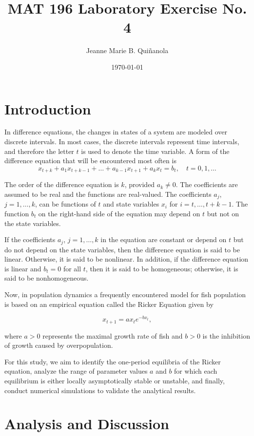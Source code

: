 \documentclass [a4paper]{article}
\title{MAT 196 Laboratory Exercise No. 4}
\author{Jeanne Marie B. Quiñanola}
\date{\today}
\begin{document}
\maketitle

\section{Introduction}
In difference equations, the changes in states of a system are modeled over discrete intervals. In most cases, the discrete intervals represent time intervals, and therefore the letter \(t\) is used to denote the time variable.
A form of the difference equation that will be encountered most often is 
\[
x_{t + k} + a_1 x_{t+k-1} + \ldots + a_{k-1} x_{t+1} + a_k x_t = b_t, \quad t = 0, 1,\ldots\]

The order of the difference equation is \(k\), provided \(a_k \neq 0\). The coefficients are assumed to be real and the functions are real-valued. The coefficients \(a_j\), \(j = 1, \ldots, k\), can be functions of \(t\) and state variables \(x_i\) for \(i = t, \ldots, t + k - 1\). The function \(b_t\) on the right-hand side of the equation may depend on \(t\) but not on the state variables.

If the coefficients \(a_j\), \(j = 1, \ldots, k\) in the equation are constant or depend on \(t\) but do not depend on the state variables, then the difference equation is said to be linear. Otherwise, it is said to be nonlinear. In addition, if the difference equation is linear and \(b_t = 0\) for all \(t\), then it is said to be homogeneous; otherwise, it is said to be nonhomogeneous.\cite{linda}

Now, in population dynamics a frequently encountered model for fish population is based on an empirical equation called the Ricker Equation given by 

\[ x_{t + 1} = ax_{t}e^{-bx_{t}},\]

where \(a > 0\) represents the maximal growth rate of fish and \( b > 0 \) is the inhibition of growth caused by overpopulation. \cite{greenwell1984ricker}

For this study, we aim to identify the one-period equilibria of the Ricker equation, analyze the range of parameter values \(a\) and \(b\) for which each equilibrium is either locally asymptotically stable or unstable, and finally, conduct numerical simulations to validate the analytical results.


\section{Analysis and Discussion}
\end{document}
